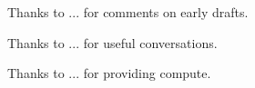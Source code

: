 Thanks to ... for comments on early drafts.

Thanks to ... for useful conversations.

Thanks to ... for providing compute.
